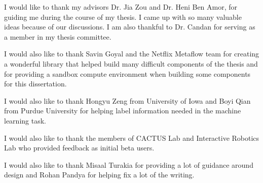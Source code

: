 I would like to thank my advisors Dr. Jia Zou and Dr. Heni Ben Amor, for guiding me during the course of my thesis. I came up with so many valuable ideas because of our discussions. I am also thankful to Dr. Candan for serving as a member in my thesis committee. 

I would also like to thank Savin Goyal and the Netflix Metaflow team for creating a wonderful library that helped build many difficult components of the thesis and for providing a sandbox compute environment when building some components for this dissertation. 

I would also like to thank Hongyu Zeng from University of Iowa and Boyi Qian from Purdue University for helping label information needed in the machine learning task. 

I would also like to thank the members of CACTUS Lab and Interactive Robotics Lab who provided feedback as initial beta users. 

I would also like to thank Misaal Turakia for providing a lot of guidance around design and Rohan Pandya for helping fix a lot of the writing. 